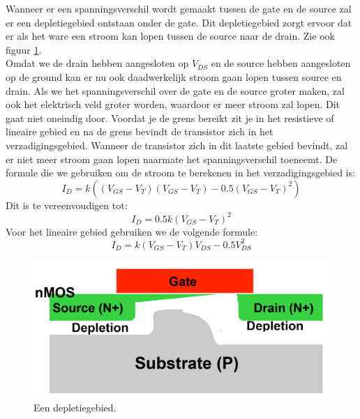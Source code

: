 \documentclass{scrartcl}  %
\begin{document}
Wanneer er een spanningsverschil wordt gemaakt tussen de gate en de source zal er een depletiegebied ontstaan onder de gate. 
Dit depletiegebied zorgt ervoor dat er als het ware een stroom kan lopen tussen de source naar de drain. 
Zie ook figuur \ref{fig:depletiegebied}. 
\\
Omdat we de drain hebben aangesloten op $V_{DS}$ en de source hebben aangesloten op de ground kan er nu ook daadwerkelijk stroom gaan lopen tussen source en drain. 
Als we het spanningsverschil over de gate en de source groter maken, zal ook het elektrisch veld groter worden, waardoor er meer stroom zal lopen. 
Dit gaat niet oneindig door. 
Voordat je de grens bereikt zit je in het resistieve of lineaire gebied en na de grens bevindt de transistor zich in het verzadigingsgebied. 
Wanneer de transistor zich in dit laatste gebied bevindt, zal er niet meer stroom gaan lopen naarmate het spanningsverschil toeneemt. 
De formule die we gebruiken om de stroom te berekenen in het verzadigingsgebied is:
\begin{equation}
I_{D} = k((V_{GS} - V_{T})(V_{GS} - V_{T}) - 0.5(V_{GS} - V_{T})^{2})
\end{equation}
\newline Dit is te vereenvoudigen tot: 
\begin{equation} I_{D} = 0.5k(V_{GS} - V_{T})^{2}
\end{equation}
\newline Voor het lineaire gebied gebruiken we de volgende formule: 
\begin{equation}
I_{D} = k(V_{GS} - V_{T})V_{DS} - 0.5V_{DS}^{2}
\end{equation}
\begin{figure}[H]
\centering
	\includegraphics[width=\textwidth]{resources/depletiegebied}
	\caption{Een depletiegebied.\cite{nick-slides}}
	\label{fig:depletiegebied}
\end{figure}
\end{document}
